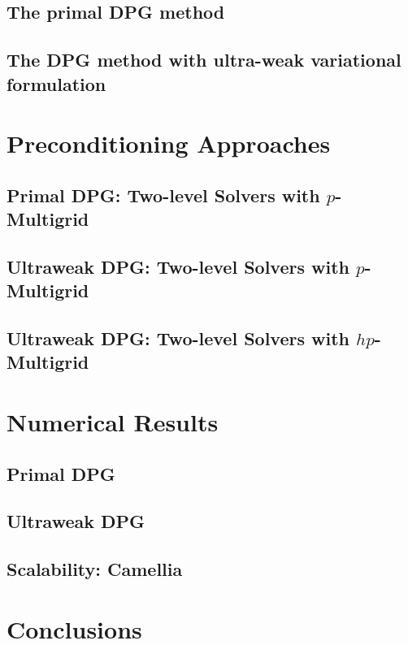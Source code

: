 \documentclass[9pt,c,3p]{elsarticle}
\begin{document}
\subsection{The primal DPG method}

\subsection{The DPG method with ultra-weak variational formulation}

\section{Preconditioning Approaches}
\subsection{Primal DPG: Two-level Solvers with $p$-Multigrid}
\subsection{Ultraweak DPG: Two-level Solvers with $p$-Multigrid}
\subsection{Ultraweak DPG: Two-level Solvers with $hp$-Multigrid}

\section{Numerical Results}
\subsection{Primal DPG}

\subsection{Ultraweak DPG}

\subsection{Scalability: Camellia}

\section{Conclusions}

\clearpage



\end{document}
